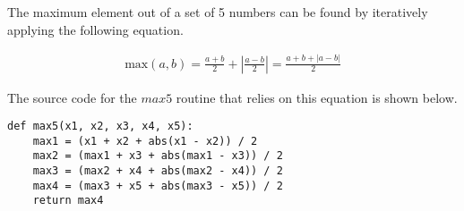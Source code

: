 \documentclass[11pt]{article}
\begin{document}
\begin{prob}{5}
\end{prob}
\begin{sol} 

The maximum element out of a set of 5 numbers can be found by iteratively applying the following equation.

\begin{eqnarray*}
\text{max}(a,b) = \frac{a+b}{2} + |\frac{a-b}{2}| = \frac{a + b + |a - b|}{2}
\end{eqnarray*}

The source code for the $max5$ routine that relies on this equation is shown below.

\begin{lstlisting}
def max5(x1, x2, x3, x4, x5):
	max1 = (x1 + x2 + abs(x1 - x2)) / 2
	max2 = (max1 + x3 + abs(max1 - x3)) / 2
	max3 = (max2 + x4 + abs(max2 - x4)) / 2
	max4 = (max3 + x5 + abs(max3 - x5)) / 2
	return max4
\end{lstlisting}

\end{sol}

\end{document}
